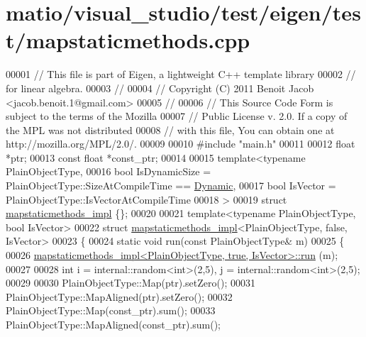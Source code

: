 \hypertarget{matio_2visual__studio_2test_2eigen_2test_2mapstaticmethods_8cpp_source}{}\section{matio/visual\+\_\+studio/test/eigen/test/mapstaticmethods.cpp}
\label{matio_2visual__studio_2test_2eigen_2test_2mapstaticmethods_8cpp_source}

\begin{DoxyCode}
00001 \textcolor{comment}{// This file is part of Eigen, a lightweight C++ template library}
00002 \textcolor{comment}{// for linear algebra.}
00003 \textcolor{comment}{//}
00004 \textcolor{comment}{// Copyright (C) 2011 Benoit Jacob <jacob.benoit.1@gmail.com>}
00005 \textcolor{comment}{//}
00006 \textcolor{comment}{// This Source Code Form is subject to the terms of the Mozilla}
00007 \textcolor{comment}{// Public License v. 2.0. If a copy of the MPL was not distributed}
00008 \textcolor{comment}{// with this file, You can obtain one at http://mozilla.org/MPL/2.0/.}
00009 
00010 \textcolor{preprocessor}{#include "main.h"}
00011 
00012 \textcolor{keywordtype}{float} *ptr;
00013 \textcolor{keyword}{const} \textcolor{keywordtype}{float} *const\_ptr;
00014 
00015 \textcolor{keyword}{template}<\textcolor{keyword}{typename} PlainObjectType,
00016          \textcolor{keywordtype}{bool} IsDynamicSize = PlainObjectType::SizeAtCompileTime == \hyperlink{namespace_eigen_ad81fa7195215a0ce30017dfac309f0b2}{Dynamic},
00017          \textcolor{keywordtype}{bool} IsVector = PlainObjectType::IsVectorAtCompileTime
00018 >
00019 \textcolor{keyword}{struct }\hyperlink{structmapstaticmethods__impl}{mapstaticmethods\_impl} \{\};
00020 
00021 \textcolor{keyword}{template}<\textcolor{keyword}{typename} PlainObjectType, \textcolor{keywordtype}{bool} IsVector>
00022 \textcolor{keyword}{struct }\hyperlink{structmapstaticmethods__impl}{mapstaticmethods\_impl}<PlainObjectType, false, IsVector>
00023 \{
00024   \textcolor{keyword}{static} \textcolor{keywordtype}{void} run(\textcolor{keyword}{const} PlainObjectType& m)
00025   \{
00026     \hyperlink{structmapstaticmethods__impl}{mapstaticmethods\_impl<PlainObjectType, true, IsVector>::run}
      (m);
00027 
00028     \textcolor{keywordtype}{int} i = internal::random<int>(2,5), j = internal::random<int>(2,5);
00029 
00030     PlainObjectType::Map(ptr).setZero();
00031     PlainObjectType::MapAligned(ptr).setZero();
00032     PlainObjectType::Map(const\_ptr).sum();
00033     PlainObjectType::MapAligned(const\_ptr).sum();

\end{DoxyCode}
